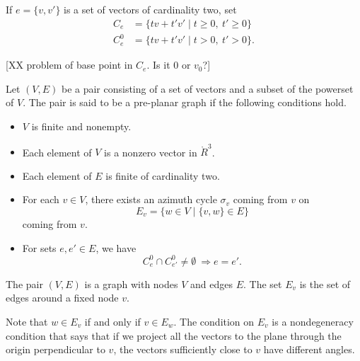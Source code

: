 
If $e=\{v,v'\}$ is a set of vectors of cardinality two,  set
  $$
  \begin{array}{lll}
  C_e &= \{t v + t' v' \mid t \ge 0,\ t'\ge 0\}\\
  C_e^0 &= \{t v + t' v' \mid t > 0,\ t' > 0\}.
  \end{array}
  $$

[XX problem of base point in $C_e$.  Is it $0$ or $v_0$?]


\begin{definition}  Let $(V,E)$ be a pair consisting of a set of
vectors and a subset of the powerset of $V$.  The pair is said to be
a pre-planar graph if the following conditions hold.
    \begin{itemize}
    \item $V$ is finite and nonempty.
    \item Each element of $V$ is a nonzero vector in $\ring{R}^3$.
    \item Each element of $E$ is finite of cardinality two.
    \item For each $v\in V$, there exists an azimuth cycle $\sigma_v$ coming from $v$ on
        $$
        E_v = \{w\in V\mid \{v,w\}\in E\}
        $$
        coming from $v$.
    \item For sets $e,e'\in E$,   we have
        $$C^0_e \cap C_{e'}^0\ne\emptyset\ \Rightarrow e = e'.$$
    \end{itemize}
\end{definition}

\begin{remark*}
The pair $(V,E)$ is a graph with nodes $V$ and edges $E$.  The set
$E_v$ is the set of edges around a fixed node $v$.
\end{remark*}

Note that $w\in E_v$ if and only if $v\in E_w$.   The condition on
$E_v$ is a nondegeneracy condition that says that if we project all
the vectors to the plane through the origin perpendicular to $v$,
the vectors sufficiently close to $v$ have different angles.

